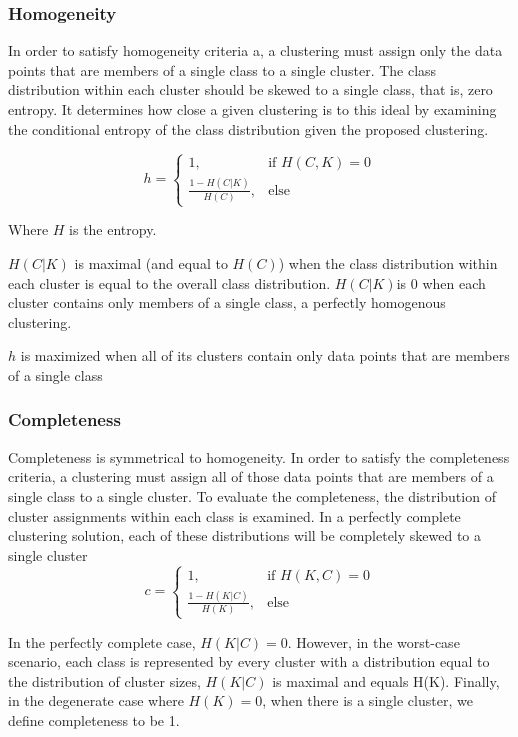 \documentclass{article}
\begin{document}
     
    \subsubsection{Homogeneity}
    In order to satisfy homogeneity criteria a, a clustering must assign only the data points that are members of a single class to a single cluster. The class distribution within each cluster should be skewed to a single class, that is, zero entropy.  It determines how close a given clustering is to this ideal by examining the conditional entropy of the class distribution given the proposed clustering. 
    
    \[
        h= 
    \begin{cases}
        1,& \text{if } H(C,K)=0\\
        \frac{1 - H(C | K)}{H(C)},              & \text{else}
    \end{cases}
    \]
    
    
    
    Where \(H\) is the entropy.
    
   \( H(C|K)\) is maximal (and equal to \(H(C)\)) when the class distribution within each cluster is equal to the overall class distribution. \(H(C|K) \)is 0 when each cluster contains only members of a single class, a perfectly homogenous clustering.

   \(h\) is maximized when all of its clusters contain only data points that are members of a single class 
    
        \subsubsection{Completeness}
    Completeness is symmetrical to homogeneity. In order to satisfy the completeness criteria, a clustering must assign all of those data points that are members of a single class to a single cluster. To evaluate the completeness, the distribution of cluster assignments within each class is examined. In a perfectly complete clustering solution, each of these distributions will be completely skewed to a single cluster 
    \[
        c= 
    \begin{cases}
        1,& \text{if } H(K,C)=0\\
        \frac{1 - H(K | C)}{H(K)},              & \text{else}
    \end{cases}
    \]

    In the perfectly complete case, \(H(K|C) = 0\). However, in the worst-case scenario, each class is represented by every cluster with a distribution equal to the distribution of cluster sizes, \( H(K|C)\) is maximal and equals H(K).  Finally, in the degenerate case where \(H(K) = 0\), when there is a single cluster, we define completeness to be 1.
\end{document}
